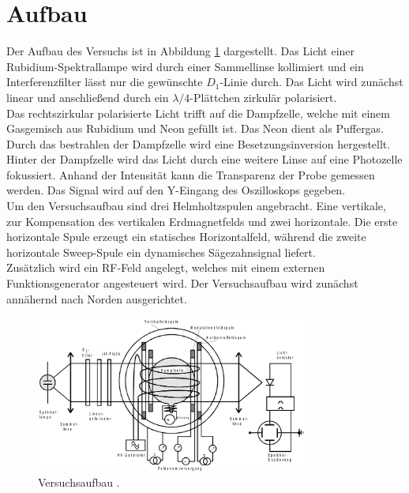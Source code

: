 \section{Aufbau}
\label{sec:Aufbau}

Der Aufbau des Versuchs ist in Abbildung \ref{fig:aufbau} dargestellt. Das Licht einer Rubidium-Spektrallampe wird durch einer Sammellinse kollimiert und ein Interferenzfilter lässt nur die gewünschte $D_1$-Linie durch. Das Licht wird zunächst linear und anschließend durch ein $\lambda/4$-Plättchen zirkulär polarisiert.\\
Das rechtszirkular polarisierte Licht trifft auf die Dampfzelle, welche mit einem Gasgemisch aus Rubidium und Neon gefüllt ist. Das Neon dient als Puffergas. Durch das bestrahlen der Dampfzelle wird eine Besetzungsinversion hergestellt.\\
Hinter der Dampfzelle wird das Licht durch eine weitere Linse auf eine Photozelle fokussiert. Anhand der Intensität kann die Transparenz der Probe gemessen werden. Das Signal wird auf den Y-Eingang des Oszilloskops gegeben.\\
Um den Versuchsaufbau sind drei Helmholtzspulen angebracht. Eine vertikale, zur Kompensation des vertikalen Erdmagnetfelds und zwei horizontale. Die erste horizontale Spule erzeugt ein statisches Horizontalfeld, während die zweite horizontale Sweep-Spule ein dynamisches Sägezahnsignal liefert.\\
Zusätzlich wird ein RF-Feld angelegt, welches mit einem externen Funktionsgenerator angesteuert wird. Der Versuchsaufbau wird zunächst annähernd nach Norden ausgerichtet.

\begin{figure}
\centering
\includegraphics[keepaspectratio,width=0.8\textwidth]{content/images/aufbau.png}
\caption{Versuchsaufbau \cite{V21}.}
\label{fig:aufbau}
\end{figure}